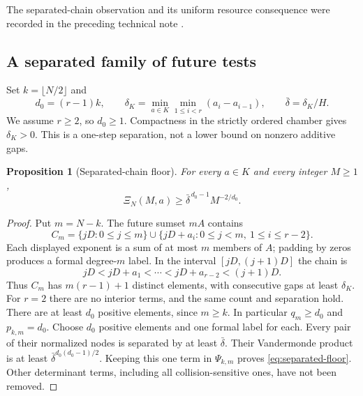 \documentclass[11pt]{amsart}
\newtheorem{proposition}[theorem]{Proposition}
\theoremstyle{definition}\newtheorem{definition}[theorem]{Definition}
\theoremstyle{remark}\newtheorem{remark}[theorem]{Remark}
\begin{document}
The separated-chain observation and its uniform resource consequence
were recorded in the preceding technical note \cite{A1v10note}.

\subsection{A separated family of future tests}
Set $k=\lfloor N/2\rfloor$ and
\[
 d_0=(r-1)k,\qquad
 \delta_K=\min_{a\in K}\min_{1\le i<r}(a_i-a_{i-1}),\qquad
 \bar\delta=\delta_K/H.
\]
We assume $r\ge2$, so $d_0\ge1$. Compactness in the strictly ordered
chamber gives $\delta_K>0$. This is a one-step separation, not a lower
bound on nonzero additive gaps.

\begin{proposition}[Separated-chain floor]\label{prop:separated-floor}
For every $a\in K$ and every integer $M\ge1$,
\begin{equation}\label{eq:separated-floor}
 \Xi_N(M,a)\ge \bar\delta^{\,d_0-1}M^{-2/d_0}.
\end{equation}
\end{proposition}
\begin{proof}
Put $m=N-k$. The future sumset $mA$ contains
\[
 C_m=\{jD:0\le j\le m\}
       \cup\{jD+a_i:0\le j<m,\ 1\le i\le r-2\}.
\]
Each displayed exponent is a sum of at most $m$ members of $A$;
padding by zeros produces a formal degree-$m$ label. In the interval
$[jD,(j+1)D]$ the chain is
\[
 jD<jD+a_1<\cdots<jD+a_{r-2}<(j+1)D.
\]
Thus $C_m$ has $m(r-1)+1$ distinct elements, with consecutive gaps at
least $\delta_K$. For $r=2$ there are no interior terms, and the same
count and separation hold. There are at least $d_0$ positive elements,
since $m\ge k$. In particular $q_m\ge d_0$ and
$p_{k,m}=d_0$.
Choose $d_0$ positive elements and one formal label for each. Every
pair of their normalized nodes is separated by at least $\bar\delta$.
Their Vandermonde product is at least
$\bar\delta^{d_0(d_0-1)/2}$. Keeping this one term in
$\Psi_{k,m}$ proves \eqref{eq:separated-floor}. Other determinant
terms, including all collision-sensitive ones, have not been removed.
\end{proof}
\end{document}
